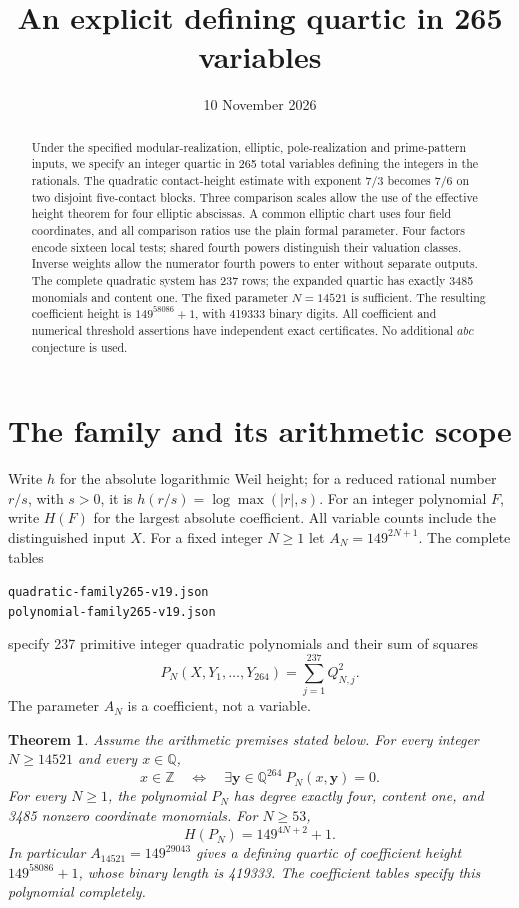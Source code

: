 \documentclass[11pt,a4paper]{article}
\title{An explicit defining quartic in 265 variables}
\author{}\date{10 November 2026}
\newtheorem{theorem}{Theorem}[section]\newtheorem{lemma}[theorem]{Lemma}
\newcommand{\Q}{\mathbb Q}\newcommand{\Z}{\mathbb Z}\newcommand{\HH}{\mathcal H}
\begin{document}
\maketitle
\begin{abstract}
Under the specified modular-realization, elliptic, pole-realization and
prime-pattern inputs, we specify an integer quartic in 265 total
variables defining the integers in the rationals. The quadratic
contact-height estimate with exponent $7/3$ becomes $7/6$ on two
disjoint five-contact blocks. Three comparison scales allow the use
of the effective height theorem for four elliptic abscissas. A common
elliptic chart uses four field coordinates, and all comparison ratios
use the plain formal parameter. Four factors encode sixteen local tests;
shared fourth powers distinguish their valuation classes. Inverse weights
allow the numerator fourth powers to enter without separate outputs.
The complete quadratic system has 237 rows;
the expanded quartic has exactly 3485 monomials and content one.
The fixed parameter $N=14521$ is sufficient. The resulting coefficient
height is $149^{58086}+1$, with 419333 binary digits. All coefficient
and numerical threshold assertions have independent exact
certificates. No additional $abc$ conjecture is used.
\end{abstract}

\section{The family and its arithmetic scope}
Write $h$ for the absolute logarithmic Weil height; for a reduced
rational number $r/s$, with $s>0$, it is
$h(r/s)=\log\max(|r|,s)$. For an integer polynomial $F$, write
$H(F)$ for the largest absolute coefficient. All variable counts
include the distinguished input $X$. For a fixed
integer $N\ge1$ let $A_N=149^{2N+1}$. The complete tables
\begin{center}\small
\nolinkurl{quadratic-family265-v19.json}\\
\nolinkurl{polynomial-family265-v19.json}
\end{center}
specify 237 primitive integer
quadratic polynomials and their sum of squares
\[
 P_N(X,Y_1,\ldots,Y_{264})=\sum_{j=1}^{237}Q_{N,j}^2.
\]
The parameter $A_N$ is a coefficient, not a variable.

\begin{theorem}\label{thm:main}
Assume the arithmetic premises stated below. For every integer
$N\ge14521$ and every $x\in\Q$,
\[
 x\in\Z\quad\Longleftrightarrow\quad
 \exists\mathbf y\in\Q^{264}\ P_N(x,\mathbf y)=0.
\]
For every $N\ge1$, the polynomial $P_N$ has degree exactly four,
content one, and 3485 nonzero coordinate monomials. For $N\ge53$,
\[
                       H(P_N)=149^{4N+2}+1.
\]
In particular $A_{14521}=149^{29043}$ gives a defining quartic of
coefficient height $149^{58086}+1$, whose binary length is 419333.
The coefficient tables specify this polynomial completely.
\end{theorem}
\end{document}
